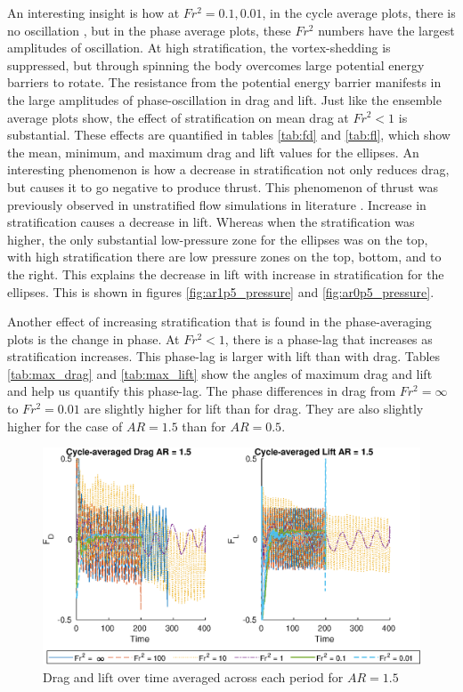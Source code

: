 An interesting insight is how at $Fr^2 = 0.1, 0.01$, in the cycle average plots, there is no oscillation , but in the phase average plots, these $Fr^2$ numbers have the largest amplitudes of oscillation. At high stratification, the vortex-shedding is suppressed, but through spinning the body overcomes large potential energy barriers to rotate. The resistance from the potential energy barrier manifests in the large amplitudes of phase-oscillation in drag and lift. Just like the ensemble average plots show, the effect of stratification on mean drag at $Fr^2 < 1$ is substantial. These effects are quantified in tables \ref{tab:fd} and \ref{tab:fl}, which show the mean, minimum, and maximum drag and lift values for the ellipses. An interesting phenomenon is how a decrease in stratification not only reduces drag, but causes it to go negative to produce thrust.  This phenomenon of thrust was previously observed in unstratified flow simulations in literature \cite{lua_rotating_2018}. Increase in stratification causes a decrease in lift. Whereas when the stratification was higher, the only substantial low-pressure zone for the ellipses was on the top, with high stratification there are low pressure zones on the top, bottom, and to the right. This explains the decrease in lift with increase in stratification for the ellipses. This is shown in figures \ref{fig:ar1p5_pressure} and \ref{fig:ar0p5_pressure}.

Another effect of increasing stratification that is found in the phase-averaging plots is the change in phase. At $Fr^2 < 1$, there is a phase-lag that increases as stratification increases. This phase-lag is larger with lift than with drag. Tables \ref{tab:max_drag} and \ref{tab:max_lift} show the angles of maximum drag and lift and help us quantify this phase-lag. The phase differences in drag from $Fr^2 = \infty$ to $Fr^2 = 0.01$ are slightly higher for lift than for drag. They are also slightly higher for the case of $AR = 1.5$ than for $AR = 0.5$. 
 
\begin{figure}
    \centerline{\includegraphics[width=\textwidth]{images/spinning_ellipse/mvmean1p5.eps}}
    \caption{Drag and lift over time averaged across each period for $AR = 1.5$}
    \label{fig:mvmean1p5}
\end{figure}

